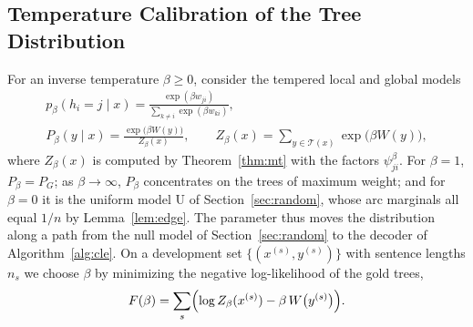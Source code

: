 \documentclass[mathematics,article,submit,pdftex,oneauthor]{Definitions/mdpi}
\newcommand{\T}{\mathcal T}
\begin{document}
\subsection{Temperature Calibration of the Tree Distribution}\label{sec:calibration}
For an inverse temperature $\beta\geqslant0$, consider the tempered local and global models
\begin{equation}\label{eq:tempered}
\begin{gathered}
p_\beta(h_i=j\mid x)=\frac{\exp(\beta w_{ji})}{\sum_{k\neq i}\exp(\beta w_{ki})},\\
P_\beta(y\mid x)=\frac{\exp\bigl(\beta W(y)\bigr)}{Z_\beta(x)},\qquad Z_\beta(x)=\sum_{y\in\T(x)}\exp\bigl(\beta W(y)\bigr),
\end{gathered}
\end{equation}
where $Z_\beta(x)$ is computed by Theorem~\ref{thm:mt} with the factors $\psi_{ji}^{\beta}$.
For $\beta=1$, $P_\beta=P_G$; as $\beta\to\infty$, $P_\beta$ concentrates on the trees of maximum weight; and for $\beta=0$ it is the uniform model U of Section~\ref{sec:random}, whose arc marginals all equal $1/n$ by Lemma~\ref{lem:edge}.
The parameter thus moves the distribution along a path from the null model of Section~\ref{sec:random} to the decoder of Algorithm~\ref{alg:cle}.
On a development set $\{(x^{(s)},y^{(s)})\}$ with sentence lengths $n_s$ we choose $\beta$ by minimizing the negative log-likelihood of the gold trees,
\begin{equation}\label{eq:nll}
F(\beta)=\sum_{s}\Bigl(\log Z_\beta(x^{(s)})-\beta\,W\bigl(y^{(s)}\bigr)\Bigr).
\end{equation}
\end{document}
